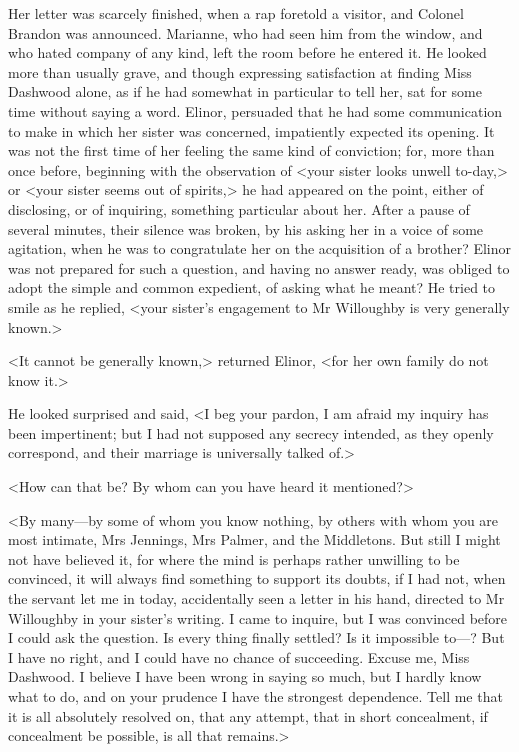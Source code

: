 Her letter was scarcely finished, when a rap foretold a visitor, and Colonel Brandon was announced. Marianne, who had seen him from the window, and who hated company of any kind, left the room before he entered it. He looked more than usually grave, and though expressing satisfaction at finding Miss Dashwood alone, as if he had somewhat in particular to tell her, sat for some time without saying a word. Elinor, persuaded that he had some communication to make in which her sister was concerned, impatiently expected its opening. It was not the first time of her feeling the same kind of conviction; for, more than once before, beginning with the observation of <your sister looks unwell to-day,> or <your sister seems out of spirits,> he had appeared on the point, either of disclosing, or of inquiring, something particular about her. After a pause of several minutes, their silence was broken, by his asking her in a voice of some agitation, when he was to congratulate her on the acquisition of a brother? Elinor was not prepared for such a question, and having no answer ready, was obliged to adopt the simple and common expedient, of asking what he meant? He tried to smile as he replied, <your sister's engagement to Mr Willoughby is very generally known.>

<It cannot be generally known,> returned Elinor, <for her own family do not know it.>

He looked surprised and said, <I beg your pardon, I am afraid my inquiry has been impertinent; but I had not supposed any secrecy intended, as they openly correspond, and their marriage is universally talked of.>

<How can that be? By whom can you have heard it mentioned?>

<By many—by some of whom you know nothing, by others with whom you are most intimate, Mrs Jennings, Mrs Palmer, and the Middletons. But still I might not have believed it, for where the mind is perhaps rather unwilling to be convinced, it will always find something to support its doubts, if I had not, when the servant let me in today, accidentally seen a letter in his hand, directed to Mr Willoughby in your sister's writing. I came to inquire, but I was convinced before I could ask the question. Is every thing finally settled? Is it impossible to—? But I have no right, and I could have no chance of succeeding. Excuse me, Miss Dashwood. I believe I have been wrong in saying so much, but I hardly know what to do, and on your prudence I have the strongest dependence. Tell me that it is all absolutely resolved on, that any attempt, that in short concealment, if concealment be possible, is all that remains.>

